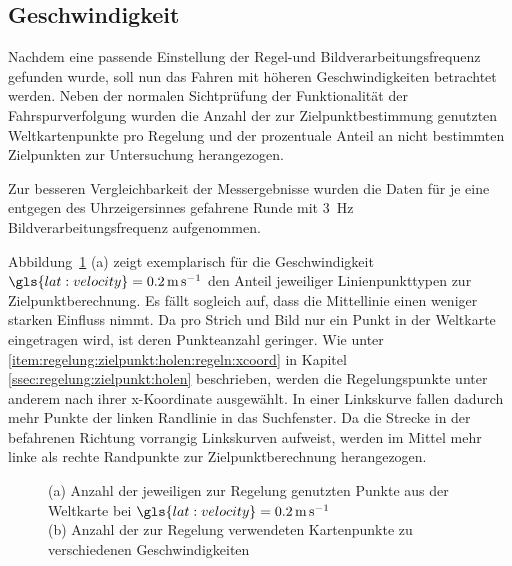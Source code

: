 \subsection{Geschwindigkeit}

Nachdem eine passende Einstellung der Regel-und Bildverarbeitungsfrequenz gefunden wurde, soll nun das Fahren mit höheren Geschwindigkeiten betrachtet werden. Neben der normalen Sichtprüfung der Funktionalität der Fahrspurverfolgung wurden die Anzahl der zur Zielpunktbestimmung genutzten Weltkartenpunkte pro Regelung und der prozentuale Anteil an nicht bestimmten Zielpunkten zur Untersuchung herangezogen. 

Zur besseren Vergleichbarkeit der Messergebnisse wurden die Daten für je eine entgegen des Uhrzeigersinnes gefahrene Runde mit \SI{3}{\hertz} Bildverarbeitungsfrequenz aufgenommen.

Abbildung~\ref{fig:evaluation:riverflow:regelungspunkte} (a) zeigt exemplarisch für die Geschwindigkeit \( \gls{lat:velocity} = \SI{0,2}{\metre\per\second} \) den  Anteil jeweiliger Linienpunkttypen zur Zielpunktberechnung. Es fällt sogleich auf, dass die Mittellinie einen weniger starken Einfluss nimmt. Da pro Strich und Bild nur ein Punkt in der Weltkarte eingetragen wird, ist deren Punkteanzahl geringer. Wie unter \ref{item:regelung:zielpunkt:holen:regeln:xcoord} in Kapitel \ref{ssec:regelung:zielpunkt:holen} beschrieben, werden die Regelungspunkte unter anderem nach ihrer x-Koordinate ausgewählt. In einer Linkskurve fallen dadurch mehr Punkte der linken Randlinie in das Suchfenster. Da die Strecke in der befahrenen Richtung vorrangig Linkskurven aufweist, werden im Mittel mehr linke als rechte Randpunkte zur Zielpunktberechnung herangezogen.

\begin{figure}[htbp] %
	\centering
	\hfill
	\caption{(a) Anzahl der jeweiligen zur Regelung genutzten Punkte aus der Weltkarte bei \( \gls{lat:velocity} = \SI{0,2}{\metre\per\second} \) \\
		(b) Anzahl der zur Regelung verwendeten Kartenpunkte zu verschiedenen Geschwindigkeiten}
	\label{fig:evaluation:riverflow:regelungspunkte}
\end{figure}

